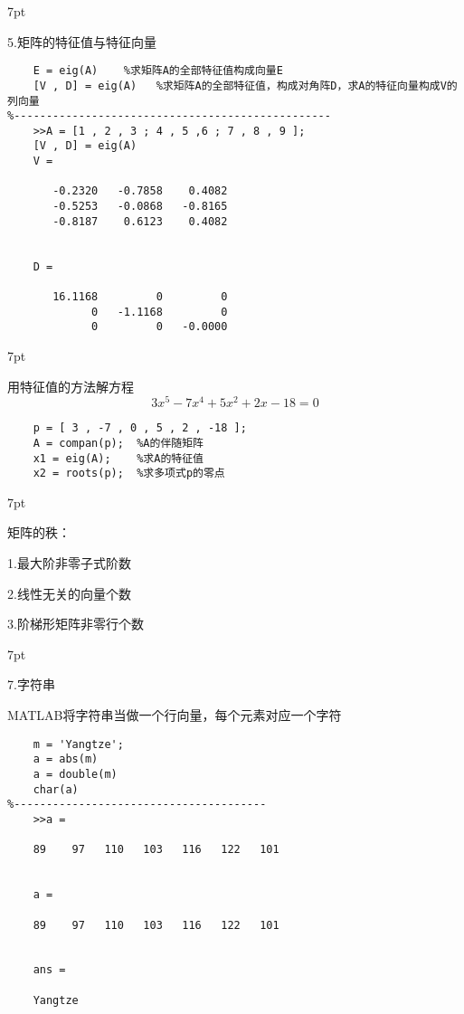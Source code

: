 \documentclass{article} %
\newenvironment{eg}{%
\def\FrameCommand{%
\hspace{1pt}%
{\color{Gray}\vrule width 2pt}%
{\color{egshade}\vrule width 4pt}%
\colorbox{egshade}%
}%
\MakeFramed{\advance\hsize-\width\FrameRestore}%
\noindent\hspace{-4.55pt}%
\begin{adjustwidth}{}{7pt}%
\vspace{2pt}\vspace{2pt}%
\normalfont %
}
{%
\vspace{2pt}\end{adjustwidth}\endMakeFramed%
}
\newenvironment{wa}{%
\def\FrameCommand{%
\hspace{1pt}%
{\color{LightCoral}\vrule width 2pt}%
{\color{washade}\vrule width 4pt}%
\colorbox{washade}%
}%
\MakeFramed{\advance\hsize-\width\FrameRestore}%
\noindent\hspace{-4.55pt}%
\begin{adjustwidth}{}{7pt}%
\vspace{2pt}\vspace{2pt}%
\normalfont %
}
{%
\vspace{2pt}\end{adjustwidth}\endMakeFramed%
}
\begin{document}
\begin{eg}
    5.矩阵的特征值与特征向量
\end{eg}
\begin{lstlisting}
    E = eig(A)    %求矩阵A的全部特征值构成向量E
    [V , D] = eig(A)   %求矩阵A的全部特征值，构成对角阵D，求A的特征向量构成V的列向量
%-------------------------------------------------
    >>A = [1 , 2 , 3 ; 4 , 5 ,6 ; 7 , 8 , 9 ];
    [V , D] = eig(A)
    V =

       -0.2320   -0.7858    0.4082
       -0.5253   -0.0868   -0.8165
       -0.8187    0.6123    0.4082


    D =

       16.1168         0         0
             0   -1.1168         0
             0         0   -0.0000

\end{lstlisting}

\begin{wa}
    用特征值的方法解方程
    $$3x^{5} - 7x^{4} + 5x^{2} + 2x - 18 = 0$$
\end{wa}
\begin{lstlisting}
    p = [ 3 , -7 , 0 , 5 , 2 , -18 ];
    A = compan(p);  %A的伴随矩阵
    x1 = eig(A);    %求A的特征值
    x2 = roots(p);  %求多项式p的零点
\end{lstlisting}

\begin{eg}
   矩阵的秩：

    1.最大阶非零子式阶数

    2.线性无关的向量个数

    3.阶梯形矩阵非零行个数 
\end{eg}

\begin{eg}
    7.字符串

    MATLAB将字符串当做一个行向量，每个元素对应一个字符
\end{eg}
\begin{lstlisting}
    m = 'Yangtze';
    a = abs(m)
    a = double(m)
    char(a)
%---------------------------------------
    >>a =

    89    97   110   103   116   122   101


    a =

    89    97   110   103   116   122   101


    ans =

    Yangtze

\end{lstlisting}
\end{document}
